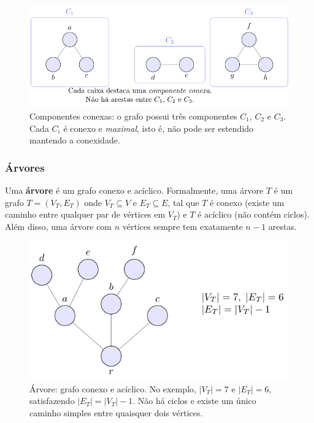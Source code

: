 \begin{figure}[H]
	\centering
	\includegraphics[width=0.9\linewidth]{figures/fig_componentes.pdf}

	\caption{Componentes conexas: o grafo possui três componentes $C_1$, $C_2$ e $C_3$. Cada $C_i$ é conexo e \emph{maximal}, isto é, não pode ser estendido mantendo a conexidade.}
	\label{fig:componentes}
\end{figure}


\subsubsection{Árvores}
Uma \textbf{árvore} é um grafo conexo e acíclico. Formalmente, uma árvore \(T\) é um grafo \(T = (V_T, E_T)\) onde \(V_T \subseteq V\) e \(E_T \subseteq E\), tal que \(T\) é conexo (existe um caminho entre qualquer par de vértices em \(V_T\)) e \(T\) é acíclico (não contém ciclos). Além disso, uma árvore com \(n\) vértices sempre tem exatamente \(n-1\) arestas.


\begin{figure}[H]
	\centering
	\includegraphics[width=0.9\linewidth]{figures/fig_arvore.pdf}

	\caption{Árvore: grafo conexo e acíclico. No exemplo, $|V_T|=7$ e $|E_T|=6$, satisfazendo $|E_T|=|V_T|-1$. Não há ciclos e existe um único caminho simples entre quaisquer dois vértices.}
	\label{fig:arvore}\end{figure}



